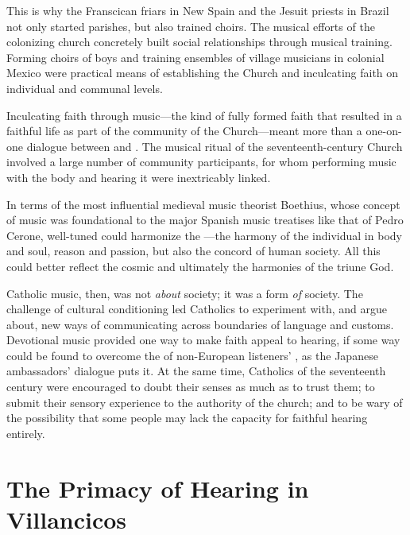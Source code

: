 This is why the Franscican friars in New Spain and the Jesuit priests in Brazil not only started parishes, but also trained choirs.
The musical efforts of the colonizing church concretely built social relationships through musical training.
Forming choirs of boys and training ensembles of village musicians in colonial Mexico were practical means of establishing the Church and inculcating faith on individual and communal levels.

Inculcating faith through music---the kind of fully formed faith that resulted in a faithful life as part of the community of the Church---meant more than a one-on-one dialogue between  and .
The musical ritual of the seventeenth-century Church involved a large number of community participants, for whom performing music with the body and hearing it were inextricably linked.

In terms of the most influential medieval music theorist Boethius, whose concept of music was foundational to the major Spanish music treatises like that of Pedro Cerone, well-tuned  could harmonize the ---the harmony of the individual in body and soul, reason and passion, but also the concord of human society.%
    \Autocite[\XXX]{Cerone:Melopeo}
All this could better reflect the cosmic  and ultimately the harmonies of the triune God.

Catholic music, then, was not \emph{about} society; it was a form \emph{of} society.
The challenge of cultural conditioning led Catholics to experiment with, and argue about, new ways of communicating across boundaries of language and customs.
Devotional music provided one way to make faith appeal to hearing, if some way could be found to overcome the  of non-European listeners' , as the Japanese ambassadors' dialogue puts it.
At the same time, Catholics of the seventeenth century were encouraged to doubt their senses as much as to trust them; to submit their sensory experience to the authority of the church; and to be wary of the possibility that some people may lack the capacity for faithful hearing entirely.

\section{The Primacy of Hearing in Villancicos}

